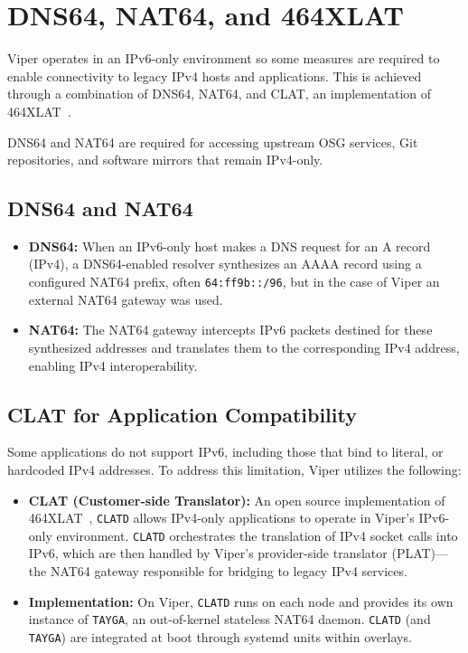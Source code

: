 \documentclass[11pt]{article}
\begin{document}
\section{DNS64, NAT64, and 464XLAT}

Viper operates in an IPv6-only environment so some measures are required to enable connectivity to legacy IPv4 hosts and applications. This is achieved through a combination of DNS64, NAT64, and CLAT, an implementation of 464XLAT~\cite{464xlat}.

DNS64 and NAT64 are required for accessing upstream OSG services, Git repositories, and software mirrors that remain IPv4-only.
\subsection{DNS64 and NAT64}
\label{sec:dns-nat}
\begin{itemize}[leftmargin=*,label=--,itemsep=1pt]
  \item \textbf{DNS64:} When an IPv6-only host makes a DNS request for an A record (IPv4), a DNS64-enabled resolver synthesizes an AAAA record using a configured NAT64 prefix, often \texttt{64:ff9b::/96}, but in the case of Viper an external NAT64 gateway was used.
  \item \textbf{NAT64:} The NAT64 gateway intercepts IPv6 packets destined for these synthesized addresses and translates them to the corresponding IPv4 address, enabling IPv4 interoperability.
\end{itemize}


  
\subsection{CLAT for Application Compatibility}
\label{sec:clatd}
Some applications do not support IPv6,  including those that bind to literal,  or hardcoded IPv4 addresses. To address this limitation, Viper utilizes the following:

\begin{itemize}[leftmargin=*,label=--,itemsep=1pt]
  \item \textbf{CLAT (Customer-side Translator):} An open source implementation \cite{clatd} of 464XLAT~\cite{464xlat}, \texttt{CLATD} allows IPv4-only applications to operate in Viper's  IPv6-only environment.  \texttt{CLATD} orchestrates the translation of IPv4 socket calls into IPv6, which are then handled by Viper’s provider-side translator (PLAT)—the NAT64 gateway responsible for bridging to legacy IPv4 services.
  \item \textbf{Implementation:} On Viper, \texttt{CLATD} runs on each node and provides its own instance of \texttt{TAYGA}, an out-of-kernel stateless NAT64 daemon. \texttt{CLATD} (and \texttt{TAYGA}) are integrated at boot through systemd units within overlays. 
\end{itemize}
\end{document}

